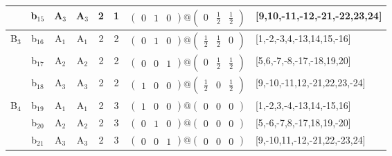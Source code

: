 \documentclass[fleqn,10pt,landscape]{article}
\begin{document}
\begin{itemize}
\begin{center}
\begin{longtable}{cc|cc|c|c|c|l}
& b$_{15}$ & A$_{3}$ & A$_{3}$ & 2 & 1 & $\begin{pmatrix} 0 & 1 & 0 \end{pmatrix}@\begin{pmatrix} 0 & \frac{1}{2} & \frac{1}{2} \end{pmatrix}$ & [9,10,-11,-12,-21,-22,23,24] \\ \hline
B$_{3}$ & b$_{16}$ & A$_{1}$ & A$_{1}$ & 2 & 2 & $\begin{pmatrix} 0 & 1 & 0 \end{pmatrix}@\begin{pmatrix} \frac{1}{2} & \frac{1}{2} & 0 \end{pmatrix}$ & [1,-2,-3,4,-13,14,15,-16] \\
& b$_{17}$ & A$_{2}$ & A$_{2}$ & 2 & 2 & $\begin{pmatrix} 0 & 0 & 1 \end{pmatrix}@\begin{pmatrix} 0 & \frac{1}{2} & \frac{1}{2} \end{pmatrix}$ & [5,6,-7,-8,-17,-18,19,20] \\
& b$_{18}$ & A$_{3}$ & A$_{3}$ & 2 & 2 & $\begin{pmatrix} 1 & 0 & 0 \end{pmatrix}@\begin{pmatrix} \frac{1}{2} & 0 & \frac{1}{2} \end{pmatrix}$ & [9,-10,-11,12,-21,22,23,-24] \\ \hline
B$_{4}$ & b$_{19}$ & A$_{1}$ & A$_{1}$ & 2 & 3 & $\begin{pmatrix} 1 & 0 & 0 \end{pmatrix}@\begin{pmatrix} 0 & 0 & 0 \end{pmatrix}$ & [1,-2,3,-4,-13,14,-15,16] \\
& b$_{20}$ & A$_{2}$ & A$_{2}$ & 2 & 3 & $\begin{pmatrix} 0 & 1 & 0 \end{pmatrix}@\begin{pmatrix} 0 & 0 & 0 \end{pmatrix}$ & [5,-6,-7,8,-17,18,19,-20] \\
& b$_{21}$ & A$_{3}$ & A$_{3}$ & 2 & 3 & $\begin{pmatrix} 0 & 0 & 1 \end{pmatrix}@\begin{pmatrix} 0 & 0 & 0 \end{pmatrix}$ & [9,-10,11,-12,-21,22,-23,24] \\
\end{longtable}
\end{center}


\end{itemize}
\end{document}

